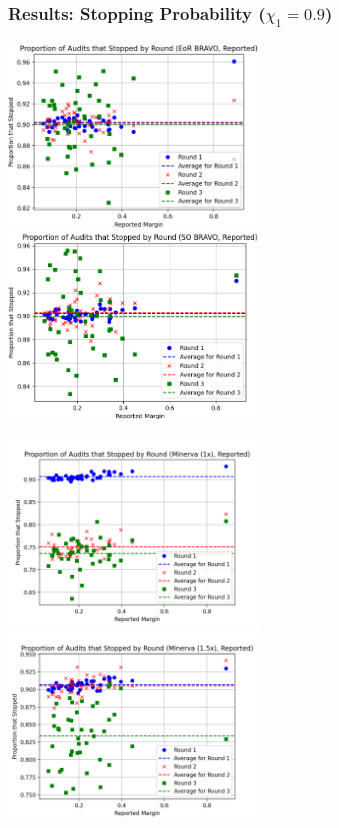 \documentclass{beamer}
\begin{document}
\begin{frame}
\frametitle{Results: Stopping Probability ($\chi_1=0.9$)}

\includegraphics[width=0.5\textwidth]{eor_bravo_90perc_10^4_corrected/sprob_first_three_cropped.png}
\includegraphics[width=0.5\textwidth]{so_bravo_90perc_10^4/sprob_first_three.png}

\includegraphics[width=0.5\textwidth]{minerva_multiround_1x_10^4/sprobs_first_three.png}
\includegraphics[width=0.5\textwidth]{minerva_multiround_1p5x_10^4/sprobs_first_three.png}
\end{frame}
\end{document}
